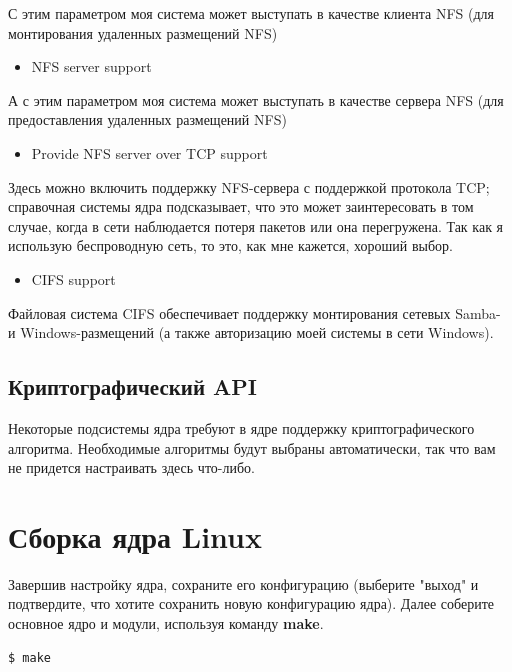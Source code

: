 \documentclass[10pt]{book}
\begin{document}
С этим параметром моя система может выступать в качестве клиента NFS (для монтирования удаленных размещений NFS)

\begin{itemize}
\item NFS server support
\end{itemize}

А с этим параметром моя система может выступать в качестве сервера NFS (для предоставления удаленных размещений NFS)

\begin{itemize}
\item Provide NFS server over TCP support
\end{itemize}

Здесь можно включить поддержку NFS-сервера с поддержкой протокола TCP; справочная системы ядра подсказывает, что это может заинтересовать в том случае, когда в сети наблюдается потеря пакетов или она перегружена. Так как я использую беспроводную сеть, то это, как мне кажется, хороший выбор.

\begin{itemize}
\item CIFS support
\end{itemize}

Файловая система CIFS обеспечивает поддержку монтирования сетевых Samba- и Windows-размещений (а также авторизацию моей системы в сети Windows).

\subsection{Криптографический API}

Некоторые подсистемы ядра требуют в ядре поддержку криптографического алгоритма. Необходимые алгоритмы будут выбраны автоматически, так что вам не придется настраивать здесь что-либо.

\section{Сборка ядра Linux}

Завершив настройку ядра, сохраните его конфигурацию (выберите "выход" и подтвердите, что хотите сохранить новую конфигурацию ядра). Далее соберите основное ядро и модули, используя команду \textbf{make}.

\begin{tcolorbox}
\begin{lstlisting}
$ make
\end{lstlisting}
\end{tcolorbox}
\end{document}
